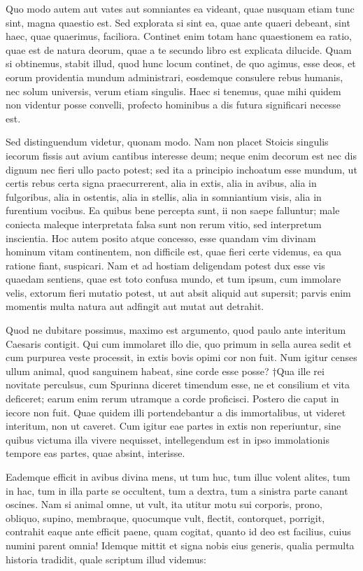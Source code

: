  Quo modo autem aut vates aut somniantes ea videant, quae nusquam etiam tunc sint, magna quaestio est. Sed explorata si sint ea, quae ante quaeri debeant, sint haec, quae quaerimus, faciliora. Continet enim totam hanc quaestionem ea ratio, quae est de natura deorum, quae a te secundo libro est explicata dilucide. Quam si obtinemus, stabit illud, quod hunc locum continet, de quo agimus, esse deos, et eorum providentia mundum administrari, eosdemque consulere rebus humanis, nec solum universis, verum etiam singulis. Haec si tenemus, quae mihi quidem non videntur posse convelli, profecto hominibus a dis futura significari necesse est.

 Sed distinguendum videtur, quonam modo. Nam non placet Stoicis singulis iecorum fissis aut avium cantibus interesse deum; neque enim decorum est nec dis dignum nec fieri ullo pacto potest; sed ita a principio inchoatum esse mundum, ut certis rebus certa signa praecurrerent, alia in extis, alia in avibus, alia in fulgoribus, alia in ostentis, alia in stellis, alia in somniantium visis, alia in furentium vocibus. Ea quibus bene percepta sunt, ii non saepe falluntur; male coniecta maleque interpretata falsa sunt non rerum vitio, sed interpretum inscientia. Hoc autem posito atque concesso, esse quandam vim divinam hominum vitam continentem, non difficile est, quae fieri certe videmus, ea qua ratione fiant, suspicari. Nam et ad hostiam deligendam potest dux esse vis quaedam sentiens, quae est toto confusa mundo, et tum ipsum, cum immolare velis, extorum fieri mutatio potest, ut aut absit aliquid aut supersit; parvis enim momentis multa natura aut adfingit aut mutat aut detrahit.

 Quod ne dubitare possimus, maximo est argumento, quod paulo ante interitum Caesaris contigit. Qui cum immolaret illo die, quo primum in sella aurea sedit et cum purpurea veste processit, in extis bovis opimi cor non fuit. Num igitur censes ullum animal, quod sanguinem habeat, sine corde esse posse? †Qua ille rei novitate perculsus, cum Spurinna diceret timendum esse, ne et consilium et vita deficeret; earum enim rerum utramque a corde proficisci. Postero die caput in iecore non fuit. Quae quidem illi portendebantur a dis immortalibus, ut videret interitum, non ut caveret. Cum igitur eae partes in extis non reperiuntur, sine quibus victuma illa vivere nequisset, intellegendum est in ipso immolationis tempore eas partes, quae absint, interisse.

 Eademque efficit in avibus divina mens, ut tum huc, tum illuc volent alites, tum in hac, tum in illa parte se occultent, tum a dextra, tum a sinistra parte canant oscines. Nam si animal omne, ut vult, ita utitur motu sui corporis, prono, obliquo, supino, membraque, quocumque vult, flectit, contorquet, porrigit, contrahit eaque ante efficit paene, quam cogitat, quanto id deo est facilius, cuius numini parent omnia! Idemque mittit et signa nobis eius generis, qualia permulta historia tradidit, quale scriptum illud videmus:

